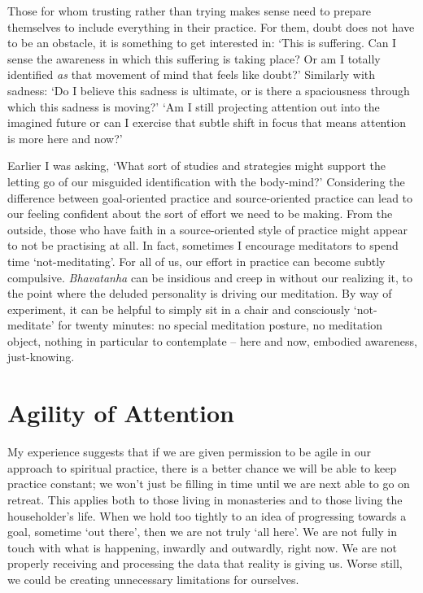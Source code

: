 Those for whom trusting rather than trying makes sense need to prepare
themselves to include everything in their practice. For them, doubt does
not have to be an obstacle, it is something to get interested in: `This
is suffering. Can I sense the awareness in which this suffering is
taking place? Or am I totally identified \emph{as} that movement of mind
that feels like doubt?' Similarly with sadness: `Do I believe this
sadness is ultimate, or is there a spaciousness through which this
sadness is moving?' `Am I still projecting attention out into the
imagined future or can I exercise that subtle shift in focus that means
attention is more here and now?'

Earlier I was asking, `What sort of studies and strategies might support
the letting go of our misguided identification with the body-mind?'
Considering the difference between goal-oriented practice and
source-oriented practice can lead to our feeling confident about the
sort of effort we need to be making. From the outside, those who have
faith in a source-oriented style of practice might appear to not be
practising at all. In fact, sometimes I encourage meditators to spend
time `not-meditating'. For all of us, our effort in practice can become
subtly compulsive. \emph{Bhavatanha} can be insidious and creep in
without our realizing it, to the point where the deluded personality is
driving our meditation. By way of experiment, it can be helpful to
simply sit in a chair and consciously `not-meditate' for twenty minutes:
no special meditation posture, no meditation object, nothing in
particular to contemplate -- here and now, embodied awareness,
just-knowing.

\section{Agility of Attention}

My experience suggests that if we are given permission to be agile in
our approach to spiritual practice, there is a better chance we will be
able to keep practice constant; we won't just be filling in time until
we are next able to go on retreat. This applies both to those living in
monasteries and to those living the householder's life.
When we hold too tightly to an idea of progressing towards a goal, sometime
`out there', then we are not truly `all here'. We are not fully in touch
with what is happening, inwardly and outwardly, right now. We are not
properly receiving and processing the data that reality is giving us.
Worse still, we could be creating unnecessary limitations for ourselves.


